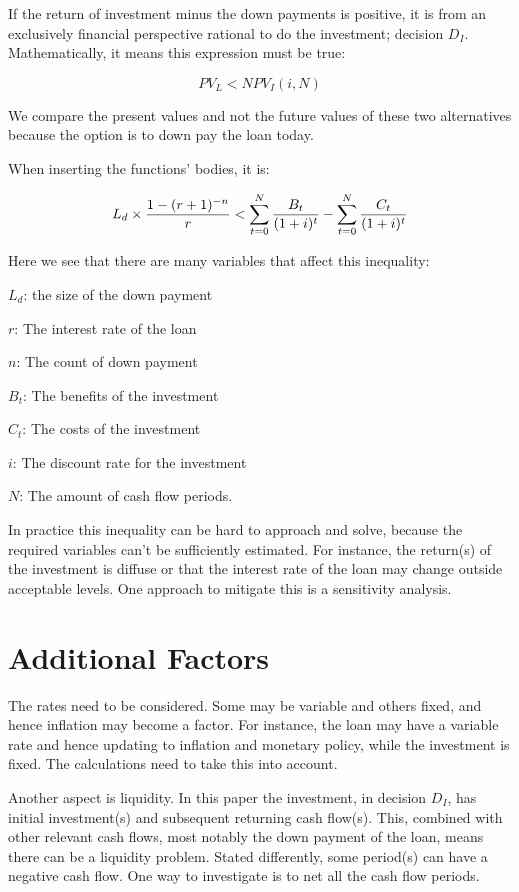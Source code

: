 \documentclass[a4paper]{article}
\begin{document}
If the return of investment minus the down payments is positive, it is from an
exclusively financial perspective rational to do the investment; decision $D_I$.
Mathematically, it means this expression must be true:

\begin{equation}
    PV_L < NPV_I(i, N)
\end{equation}

We compare the present values and not the future values of these two
alternatives because the option is to down pay the loan today.

When inserting the functions' bodies, it is:

\begin{equation}
    \PV_L < \NPV_I
\end{equation}

Here we see that there are many variables that affect this inequality:

$L_d$: the size of the down payment

$r$: The interest rate of the loan

$n$: The count of down payment

$B_t$: The benefits of the investment

$C_t$: The costs of the investment

$i$: The discount rate for the investment

$N$: The amount of cash flow periods.

In practice this inequality can be hard to approach and solve, because the
required variables can't be sufficiently estimated. For instance, the return(s)
of the investment is diffuse or that the interest rate of the loan may change
outside acceptable levels. One approach to mitigate this is a sensitivity
analysis.

\section{Additional Factors}

The rates need to be considered. Some may be variable and others fixed, and
hence inflation may become a factor. For instance, the loan may have a variable
rate and hence updating to inflation and monetary policy, while the investment
is fixed. The calculations need to take this into account.

Another aspect is liquidity. In this paper the investment, in decision $D_I$,
has initial investment(s) and subsequent returning cash flow(s). This, combined
with other relevant cash flows, most notably the down payment of the loan, means
there can be a liquidity problem. Stated differently, some period(s) can have a
negative cash flow. One way to investigate is to net all the cash flow periods.
\end{document}

